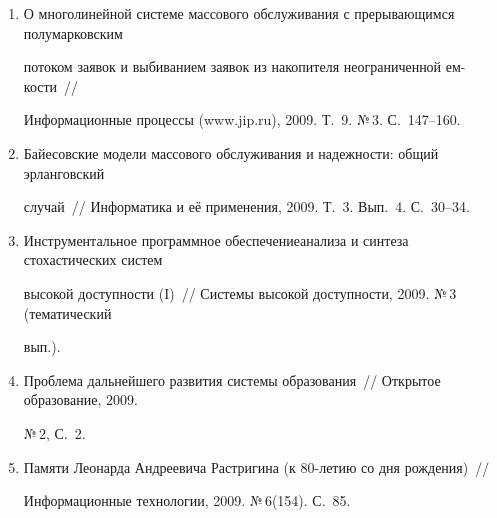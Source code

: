 \begin{enumerate}[1.]
\item {}


О многолинейной системе массового обслуживания с прерывающимся полумарковским 


потоком заявок и выбиванием заявок из накопителя неограниченной ем-\linebreak кости~// 


Информационные процессы ({\sf www.jip.ru}), 2009. Т.~9.  №\,3. С.~147--160.





\item {}


Байесовские модели массового обслуживания и надежности: общий эрланговский 


случай~// Информатика и её применения, 2009. Т.~3. Вып.~4. С.~30--34.





\item {}


Инструментальное программное обеспечение\linebreak анализа и синтеза стохастических систем 


высокой доступности (I)~// Системы высокой доступности, 2009. №\,3 (тематический 


вып.).





\item {}


Проблема дальнейшего развития системы образования~// Открытое образование, 2009. 


№\,2, С.~2.


\pagebreak





\item{}


Памяти Леонарда Андреевича Растригина (к 80-летию со дня рождения)~// 


Информационные технологии, 2009. №\,6(154). С.~85.






\end{enumerate}

